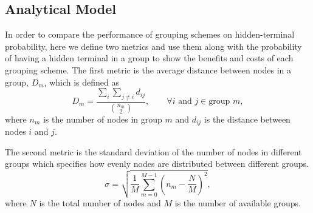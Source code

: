 \subsection{Analytical Model}

In order to compare the performance of grouping schemes on hidden-terminal probability, here we define two metrics and use them along with the probability of having a hidden terminal in a group to show the benefits and costs of each grouping scheme. The first metric is the average distance between nodes in a group, $D_m$, which is defined as
\begin{equation}
D_m=\frac{\sum_{i} \sum_{j \neq i} d_{ij}}{{n_m \choose 2}},  \quad \quad \forall i \text{ and } j \in \text{group $m$},
\end{equation}
where $n_m$ is the number of nodes in group $m$ and $d_{ij}$ is the distance between nodes $i$ and $j$.

The second metric is the standard deviation of the number of nodes in different groups which specifies how evenly nodes are distributed between different groups.
\begin{equation}
\sigma=\sqrt{\frac{1}{M}\sum_{m=0}^{M-1}\left( n_m - \frac{N}{M} \right)^2},
\end{equation}
where $N$ is the total number of nodes and $M$ is the number of available groups.

